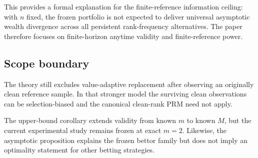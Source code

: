 This provides a formal explanation for the finite-reference information ceiling: with \(n\) fixed, the frozen portfolio is not expected to deliver universal asymptotic wealth divergence across all persistent rank-frequency alternatives. The paper therefore focuses on finite-horizon anytime validity and finite-reference power.

\subsection{Scope boundary}

The theory still excludes value-adaptive replacement after observing an originally clean reference sample. In that stronger model the surviving clean observations can be selection-biased and the canonical clean-rank PRM need not apply.

The upper-bound corollary extends validity from known \(m\) to known \(M\), but the current experimental study remains frozen at exact \(m=2\). Likewise, the asymptotic proposition explains the frozen bettor family but does not imply an optimality statement for other betting strategies.
